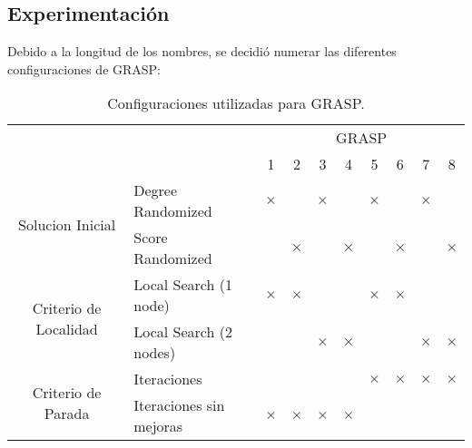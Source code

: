 \subsection{Experimentación}

Debido a la longitud de los nombres, se decidió numerar las diferentes configuraciones de GRASP:

\begin{table}[H]
\centering
\begin{tabular}{cl|c|c|c|c|c|c|c|c|}
\cline{3-10}
                                                             &                         & \multicolumn{8}{c|}{GRASP}                                                            \\ \cline{3-10} 
                                                             &                         & 1        & 2        & 3        & 4        & 5        & 6        & 7        & 8        \\ \hline
\multicolumn{1}{|c|}{\multirow{2}{*}{Solucion Inicial}}      & Degree Randomized       & $\times$ &          & $\times$ &          & $\times$ &          & $\times$ &          \\ \cline{2-10} 
\multicolumn{1}{|c|}{}                                       & Score Randomized        &          & $\times$ &          & $\times$ &          & $\times$ &          & $\times$ \\ \hline
\multicolumn{1}{|c|}{\multirow{2}{*}{Criterio de Localidad}} & Local Search (1 node)   & $\times$ & $\times$ &          &          & $\times$ & $\times$ &          &          \\ \cline{2-10} 
\multicolumn{1}{|c|}{}                                       & Local Search (2 nodes)  &          &          & $\times$ & $\times$ &          &          & $\times$ & $\times$ \\ \hline
\multicolumn{1}{|c|}{\multirow{2}{*}{Criterio de Parada}}    & Iteraciones            &          &          &          &          & $\times$ & $\times$ & $\times$ & $\times$ \\ \cline{2-10} 
\multicolumn{1}{|c|}{}                                       & Iteraciones sin mejoras & $\times$ & $\times$ & $\times$ & $\times$ &          &          &          &          \\ \hline
\end{tabular}
\caption{Configuraciones utilizadas para GRASP.}
\end{table}

